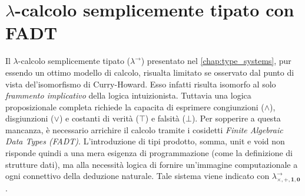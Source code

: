 \section{\texorpdfstring{$\lambda$}{Lambda}-calcolo semplicemente tipato con FADT}
Il $\lambda$-calcolo semplicemente tipato ($\lambda^{\to}$) presentato nel \ref{chap:type_systems}, pur essendo un ottimo modello di calcolo,
risualta limitato se osservato dal punto di vista del'isomorfismo di Curry-Howard. Esso infatti risulta isomorfo al solo \emph{frammento implicativo}
della logica intuizionista. Tuttavia una logica proposizionale completa richiede la capacita di esprimere congiunzioni ($\land$), disgiunzioni ($\lor$) 
e costanti di verità ($\top$) e falsità ($\bot$). Per sopperire a questa mancanza, è necessario arrichire il calcolo tramite i cosidetti \emph{Finite 
Algebraic Data Types (FADT)}. L'introduzione di tipi prodotto, somma, unit e void non risponde quindi a una mera esigenza di programmazione (come la 
definizione di strutture dati), ma alla necessità logica di fornire un'immagine computazionale a ogni connettivo della deduzione naturale. Tale sistema
viene indicato con $\lambda^{\to}_{\times, +, \mathbf{1}, \mathbf{0}}$.

